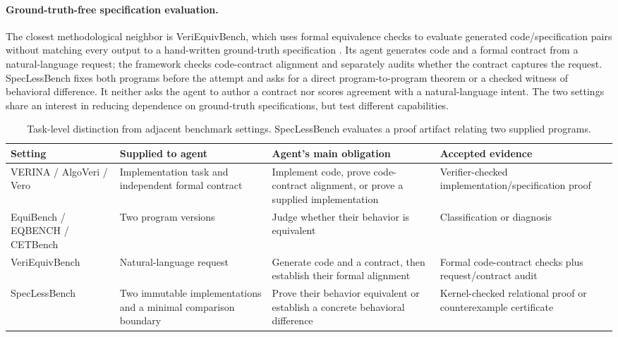 \documentclass{article}
\begin{document}
\paragraph{Ground-truth-free specification evaluation.}
The closest methodological neighbor is VeriEquivBench, which uses formal equivalence checks to evaluate generated code/specification pairs without matching every output to a hand-written ground-truth specification \citep{zeng2026veriequivbench}. Its agent generates code and a formal contract from a natural-language request; the framework checks code-contract alignment and separately audits whether the contract captures the request. SpecLessBench fixes both programs before the attempt and asks for a direct program-to-program theorem or a checked witness of behavioral difference. It neither asks the agent to author a contract nor scores agreement with a natural-language intent. The two settings share an interest in reducing dependence on ground-truth specifications, but test different capabilities.

\begin{table}[t]
\centering
\small
\caption{Task-level distinction from adjacent benchmark settings. SpecLessBench evaluates a proof artifact relating two supplied programs.}
\label{tab:position}
\begin{tabular}{p{}p{}p{}p{}}
\toprule
Setting & Supplied to agent & Agent's main obligation & Accepted evidence \\
\midrule
VERINA / AlgoVeri / Vero & Implementation task and independent formal contract & Implement code, prove code-contract alignment, or prove a supplied implementation & Verifier-checked implementation/specification proof \\
EquiBench / EQBENCH / CETBench & Two program versions & Judge whether their behavior is equivalent & Classification or diagnosis \\
VeriEquivBench & Natural-language request & Generate code and a contract, then establish their formal alignment & Formal code-contract checks plus request/contract audit \\
SpecLessBench & Two immutable implementations and a minimal comparison boundary & Prove their behavior equivalent or establish a concrete behavioral difference & Kernel-checked relational proof or counterexample certificate \\
\bottomrule
\end{tabular}
\end{table}
\end{document}
